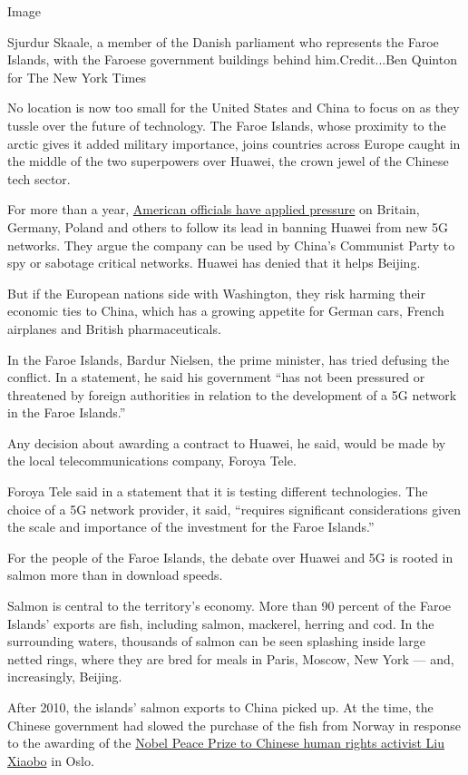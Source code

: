 Image

Sjurdur Skaale, a member of the Danish parliament who represents the
Faroe Islands, with the Faroese government buildings behind
him.Credit...Ben Quinton for The New York Times

No location is now too small for the United States and China to focus on
as they tussle over the future of technology. The Faroe Islands, whose
proximity to the arctic gives it added military importance, joins
countries across Europe caught in the middle of the two superpowers over
Huawei, the crown jewel of the Chinese tech sector.

For more than a year,
\href{https://www.nytimes.com/2019/01/26/us/politics/huawei-china-us-5g-technology.html}{American
officials have applied pressure} on Britain, Germany, Poland and others
to follow its lead in banning Huawei from new 5G networks. They argue
the company can be used by China's Communist Party to spy or sabotage
critical networks. Huawei has denied that it helps Beijing.

But if the European nations side with Washington, they risk harming
their economic ties to China, which has a growing appetite for German
cars, French airplanes and British pharmaceuticals.

In the Faroe Islands, Bardur Nielsen, the prime minister, has tried
defusing the conflict. In a statement, he said his government ``has not
been pressured or threatened by foreign authorities in relation to the
development of a 5G network in the Faroe Islands.''

Any decision about awarding a contract to Huawei, he said, would be made
by the local telecommunications company, Foroya Tele.

Foroya Tele said in a statement that it is testing different
technologies. The choice of a 5G network provider, it said, ``requires
significant considerations given the scale and importance of the
investment for the Faroe Islands.''

For the people of the Faroe Islands, the debate over Huawei and 5G is
rooted in salmon more than in download speeds.

Salmon is central to the territory's economy. More than 90 percent of
the Faroe Islands' exports are fish, including salmon, mackerel, herring
and cod. In the surrounding waters, thousands of salmon can be seen
splashing inside large netted rings, where they are bred for meals in
Paris, Moscow, New York --- and, increasingly, Beijing.

After 2010, the islands' salmon exports to China picked up. At the time,
the Chinese government had slowed the purchase of the fish from Norway
in response to the awarding of the
\href{https://www.nytimes.com/2010/12/11/world/europe/11nobel.html}{Nobel
Peace Prize to Chinese human rights activist Liu Xiaobo} in Oslo.

